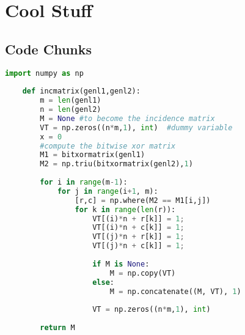 \section{Cool Stuff}

  \subsection{Code Chunks}

  \begin{lstlisting}[language=Python]
    import numpy as np
        
    def incmatrix(genl1,genl2):
        m = len(genl1)
        n = len(genl2)
        M = None #to become the incidence matrix
        VT = np.zeros((n*m,1), int)  #dummy variable
        x = 0
        #compute the bitwise xor matrix
        M1 = bitxormatrix(genl1)
        M2 = np.triu(bitxormatrix(genl2),1) 
    
        for i in range(m-1):
            for j in range(i+1, m):
                [r,c] = np.where(M2 == M1[i,j])
                for k in range(len(r)):
                    VT[(i)*n + r[k]] = 1;
                    VT[(i)*n + c[k]] = 1;
                    VT[(j)*n + r[k]] = 1;
                    VT[(j)*n + c[k]] = 1;
                    
                    if M is None:
                        M = np.copy(VT)
                    else:
                        M = np.concatenate((M, VT), 1)
                    
                    VT = np.zeros((n*m,1), int)
        
        return M
    \end{lstlisting}

\newpage
